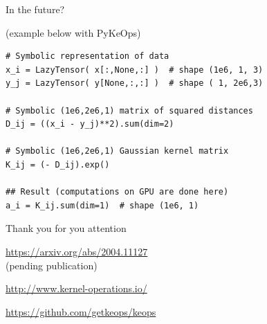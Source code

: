 \documentclass[14pt]{beamer}
\begin{document}
\begin{frame}[fragile]{In the future?}

 {\small (example below with PyKeOps)}

\begin{verbatim}
# Symbolic representation of data
x_i = LazyTensor( x[:,None,:] )  # shape (1e6, 1, 3)
y_j = LazyTensor( y[None,:,:] )  # shape ( 1, 2e6,3)

# Symbolic (1e6,2e6,1) matrix of squared distances
D_ij = ((x_i - y_j)**2).sum(dim=2)

# Symbolic (1e6,2e6,1) Gaussian kernel matrix
K_ij = (- D_ij).exp()

## Result (computations on GPU are done here)
a_i = K_ij.sum(dim=1)  # shape (1e6, 1)
\end{verbatim}

\end{frame}


\begin{frame}[standout]{}

Thank you for you attention\bigskip\bigskip\bigskip

{\small

\url{https://arxiv.org/abs/2004.11127}\\
(pending publication)\bigskip 

\url{http://www.kernel-operations.io/}\bigskip

\url{https://github.com/getkeops/keops}

}

\end{frame}
\end{document}
